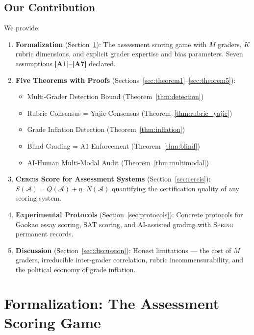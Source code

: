 \documentclass[11pt,a4paper]{article}
\theoremstyle{definition}
\theoremstyle{remark}
\newcommand{\assumptionTag}[1]{\textsf{\textbf{[A#1]}}}
\newcommand{\Cercis}{\textsc{Cercis}}
\newcommand{\Spring}{\textsc{Spring}}
\newcommand{\cA}{\mathcal{A}}
\begin{document}
\subsection{Our Contribution}
We provide:
\begin{enumerate}[label=(\roman*)]
    \item \textbf{Formalization} (Section~\ref{sec:formalization}): The assessment scoring game with $M$ graders, $K$ rubric dimensions, and explicit grader expertise and bias parameters. Seven assumptions \assumptionTag{1}--\assumptionTag{7} declared.
    \item \textbf{Five Theorems with Proofs} (Sections~\ref{sec:theorem1}--\ref{sec:theorem5}):
    \begin{itemize}[nosep]
        \item Multi-Grader Detection Bound (Theorem~\ref{thm:detection})
        \item Rubric Consensus = Yajie Consensus (Theorem~\ref{thm:rubric_yajie})
        \item Grade Inflation Detection (Theorem~\ref{thm:inflation})
        \item Blind Grading = A1 Enforcement (Theorem~\ref{thm:blind})
        \item AI-Human Multi-Modal Audit (Theorem~\ref{thm:multimodal})
    \end{itemize}
    \item \textbf{\Cercis{} Score for Assessment Systems} (Section~\ref{sec:cercis}): $S(\cA) = Q(\cA) + \eta \cdot N(\cA)$ quantifying the certification quality of any scoring system.
    \item \textbf{Experimental Protocols} (Section~\ref{sec:protocols}): Concrete protocols for Gaokao essay scoring, SAT scoring, and AI-assisted grading with \Spring{} permanent records.
    \item \textbf{Discussion} (Section~\ref{sec:discussion}): Honest limitations — the cost of $M$ graders, irreducible inter-grader correlation, rubric incommensurability, and the political economy of grade inflation.
\end{enumerate}
\section{Formalization: The Assessment Scoring Game}
\label{sec:formalization}
\end{document}
